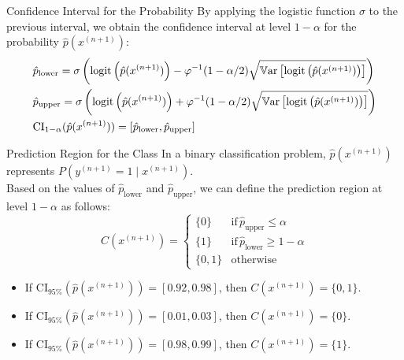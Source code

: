 \begin{frame}{Confidence Interval for the Probability}
	By applying the logistic function $\sigma$ to the previous interval, we obtain the confidence interval at level $1 - \alpha$ for the probability $\hat{p}(x^{(n+1)})$:
	\begin{equation}
		\begin{aligned}
			&\hat{p}_{\text{lower}} = \sigma\left(\operatorname{logit}\left(\hat{p}(x^{(n+1)})\right) - \varphi^{-1}(1 - \alpha/2) \sqrt{\operatorname{\mathbb{V}ar}\left[\operatorname{logit}\left(\hat{p}(x^{(n+1)})\right)\right]}\right) \\
			&\hat{p}_{\text{upper}} = \sigma\left(\operatorname{logit}\left(\hat{p}(x^{(n+1)})\right) + \varphi^{-1}(1 - \alpha/2) \sqrt{\operatorname{\mathbb{V}ar}\left[\operatorname{logit}\left(\hat{p}(x^{(n+1)})\right)\right]}\right) \\
			&\text{CI}_{1-\alpha}(\hat{p}(x^{(n+1)})) = [\hat{p}_{\text{lower}}, \hat{p}_{\text{upper}}]
		\end{aligned}
		\nonumber
	\end{equation}
\end{frame}

\begin{frame}{Prediction Region for the Class}
	In a binary classification problem, $\hat{p}(x^{(n+1)})$ represents $P(y^{(n+1)} = 1 \mid x^{(n+1)})$. \\
	Based on the values of $\hat{p}_{\text{lower}}$ and $\hat{p}_{\text{upper}}$, we can define the prediction region at level $1 - \alpha$ as follows:
	\begin{equation}
		C(x^{(n+1)}) = 
		\begin{cases}
			\{0\} & \text{if} \, \hat{p}_{\text{upper}} \le \alpha \\
			\{1\} & \text{if} \, \hat{p}_{\text{lower}} \ge 1 - \alpha \\
			\{0, 1\} & \text{otherwise}
		\end{cases}
		\nonumber
	\end{equation}
	\pause
	\begin{itemize}
		\item If $\text{CI}_{95\%}(\hat{p}(x^{(n+1)})) = [0.92, 0.98]$, then $C(x^{(n+1)}) = \{0, 1\}$.
		\item If $\text{CI}_{95\%}(\hat{p}(x^{(n+1)})) = [0.01, 0.03]$, then $C(x^{(n+1)}) = \{0\}$.
		\item If $\text{CI}_{95\%}(\hat{p}(x^{(n+1)})) = [0.98, 0.99]$, then $C(x^{(n+1)}) = \{1\}$.
	\end{itemize}
\end{frame}